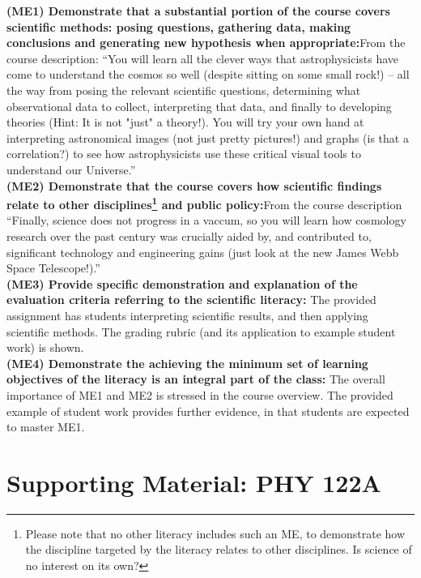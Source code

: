 \documentclass[12pt]{article}
\begin{document}
{\bf (ME1) Demonstrate that a substantial portion of the course covers scientific methods: posing
  questions, gathering data, making conclusions and generating new hypothesis when appropriate:}From the course description:  ``You will learn all the clever ways that astrophysicists have come to understand the cosmos so well (despite sitting on some small rock!) -- all the way from posing the relevant scientific questions, determining what observational data to collect, interpreting that data, and finally to developing theories (Hint: It is not "just" a theory!). You will try your own hand at interpreting astronomical images (not just pretty pictures!) and graphs (is that a correlation?) to see how astrophysicists use these critical visual tools to understand our Universe.''\\[1pt]

{\bf (ME2) Demonstrate that the course covers how scientific findings relate to other disciplines\footnote{Please note that no other literacy includes such an ME, to demonstrate how the discipline targeted by the literacy relates to other disciplines.  Is science of no interest on its own?} and public policy:}From the course description ``Finally, science does not progress in a vaccum, so you will learn how cosmology research over the past century was crucially aided by, and contributed to, significant technology and engineering gains (just look at the new James Webb Space Telescope!).''\\[1pt]

{\bf (ME3) Provide specific demonstration and explanation of the evaluation criteria referring to the
scientific literacy:} The provided assignment has students interpreting scientific results, and then applying scientific methods.  The grading rubric (and its application to example student work) is shown.\\

{\bf (ME4) Demonstrate the achieving the minimum set of learning objectives of the literacy is an
  integral part of the class:}  The overall importance of ME1 and ME2 is stressed in the course overview.  The provided example of student work provides further evidence, in that students are expected to master ME1.\\

\appendix

\newpage
\section{Supporting Material: PHY 122A}
\label{sec:supa}
\end{document}
